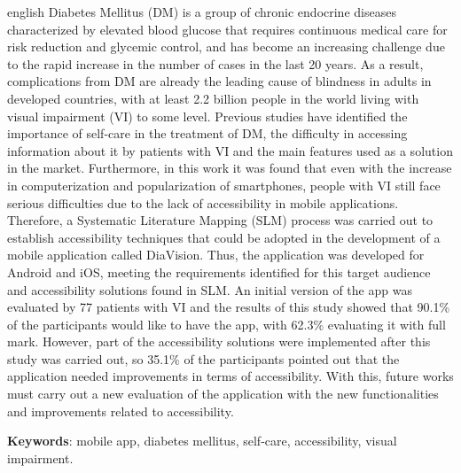 \setlength{\absparsep}{18pt} %
\begin{resumo}[Abstract]
  \begin{otherlanguage*}{english}
    Diabetes Mellitus (DM) is a group of chronic endocrine diseases characterized by elevated blood
    glucose that requires continuous medical care for risk reduction and glycemic control, and has become
    an increasing challenge due to the rapid increase in the number of cases in the last 20 years. As a result,
    complications from DM are already the leading cause of blindness in adults in developed countries, with at
    least 2.2 billion people in the world living with visual impairment (VI) to some level. Previous studies
    have identified the importance of self-care in the treatment of DM, the difficulty in accessing information
    about it by patients with VI and the main features used as a solution in the market. Furthermore, in this
    work it was found that even with the increase in computerization and popularization of smartphones,
    people with VI still face serious difficulties due to the lack of accessibility in mobile applications.
    Therefore, a Systematic Literature Mapping (SLM) process was carried out to establish accessibility
    techniques that could be adopted in the development of a mobile application called DiaVision. Thus,
    the application was developed for Android and iOS, meeting the requirements identified for this target
    audience and accessibility solutions found in SLM\@. An initial version of the app was
    evaluated by 77 patients with VI and the results of this study showed that 90.1\% of the participants
    would like to have the app, with 62.3\% evaluating it with full mark. However, part of the
    accessibility solutions were implemented after this study was carried out, so 35.1\% of the
    participants pointed out that the application needed improvements in terms of accessibility. With
    this, future works must carry out a new evaluation of the application with the new functionalities
    and improvements related to accessibility.

    \textbf{Keywords}: mobile app, diabetes mellitus, self-care, accessibility, visual impairment.
  \end{otherlanguage*}
\end{resumo}